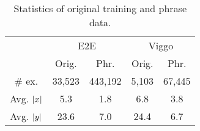 \begin{table}
\begin{tabular}{ccccc}
\toprule
            & \multicolumn{2}{c}{E2E} & \multicolumn{2}{c}{Viggo}\\
        \cmidrule(lr){2-3}
        \cmidrule(lr){4-5}
                & Orig. & Phr. & Orig. & Phr. \\
\midrule
\# ex. & 33,523 & 443,192 &  5,103  & 67,445 \\
Avg. ${\lvert x \rvert}$ &5.3 & 1.8 & 6.8 & 3.8\\
Avg. ${\lvert y \rvert}$ &23.6 & 7.0& 24.4 & 6.7\\
\bottomrule
\end{tabular}
\caption{Statistics of original training and phrase data.}
\label{tab:main.dataset.stats}
\end{table}
